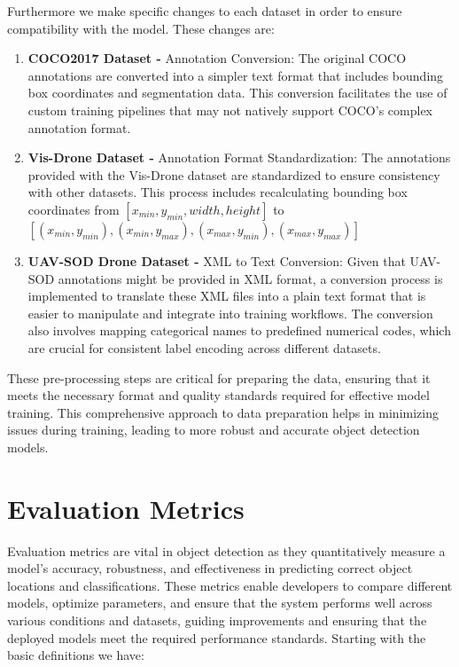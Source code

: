 \newpage

Furthermore we make specific changes to each dataset in order to ensure compatibility with the model. These changes are:

\begin{enumerate}
    \item \textbf{COCO2017 Dataset - } Annotation Conversion: The original COCO annotations are converted into a simpler text format that includes bounding 
    box coordinates and segmentation data. This conversion facilitates the use of custom training pipelines that may not natively support COCO's complex 
    annotation format.

    \item \textbf{Vis-Drone Dataset - } Annotation Format Standardization: The annotations provided with the Vis-Drone dataset are standardized to ensure 
    consistency with other datasets. This process includes recalculating bounding box coordinates from $[x_{min}, y_{min}, width, height]$ to  
    $[(x_{min}, y_{min}), (x_{min}, y_{max}), (x_{max}, y_{min}), (x_{max}, y_{max})]$

    \item \textbf{UAV-SOD Drone Dataset - } XML to Text Conversion: Given that UAV-SOD annotations might be provided in XML format, a conversion process 
    is implemented to translate these XML files into a plain text format that is easier to manipulate and integrate into training workflows. The conversion 
    also involves mapping categorical names to predefined numerical codes, which are crucial for consistent label encoding across different datasets.
\end{enumerate}

These pre-processing steps are critical for preparing the data, ensuring that it meets the necessary format and quality standards required for effective 
model training. This comprehensive approach to data preparation helps in minimizing issues during training, leading to more robust and accurate object 
detection models.



\section{Evaluation Metrics}


Evaluation metrics are vital in object detection as they quantitatively measure a model's accuracy, robustness, and effectiveness in predicting correct 
object locations and classifications. These metrics enable developers to compare different models, optimize parameters, and ensure that the system performs 
well across various conditions and datasets, guiding improvements and ensuring that the deployed models meet the required performance standards. Starting 
with the basic definitions we have:

